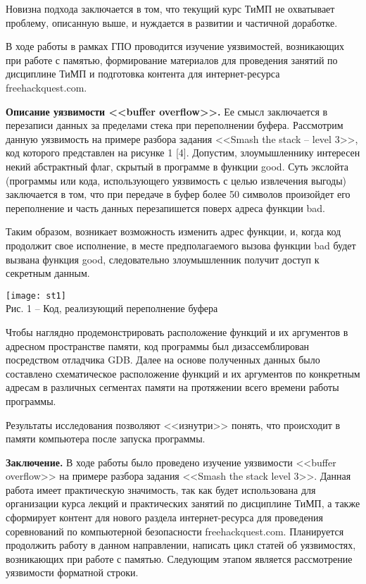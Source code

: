 Новизна подхода заключается в том, что текущий курс ТиМП не охватывает проблему, описанную выше, и нуждается в развитии и частичной доработке.\par
В ходе работы в рамках ГПО проводится изучение уязвимостей, возникающих при работе с памятью, формирование материалов для проведения занятий по дисциплине ТиМП и подготовка контента для интернет-ресурса freehackquest.com.\par
\textbf{Описание уязвимости <<buffer overflow>>.} Ее смысл заключается в перезаписи данных за пределами стека при переполнении буфера. Рассмотрим данную уязвимость на примере разбора задания <<Smash the stack -- level 3>>, код которого представлен на рисунке 1 [4]. Допустим, злоумышленнику интересен некий абстрактный флаг, скрытый в программе в функции good. Суть экслойта (программы или кода, использующего уязвимость с целью извлечения выгоды) заключается в том, что при передаче в буфер более 50 символов произойдет его переполнение и часть данных перезапишется поверх адреса функции bad.\par 
Таким образом, возникает возможность изменить адрес функции, и, когда код продолжит свое исполнение, в месте предполагаемого вызова функции bad будет вызвана функция good, следовательно злоумышленник получит доступ к секретным данным.\par
\begin{center}
\texttt{[image: st1]}\\
\small{Рис. 1 -- Код, реализующий переполнение буфера}\\
\end{center}
\vspace{\baselineskip}
Чтобы наглядно продемонстрировать расположение функций и их аргументов в адресном пространстве памяти, код программы был дизассемблирован посредством отладчика GDB. Далее на основе полученных данных было составлено схематическое расположение функций и их аргументов по конкретным адресам в различных сегментах памяти на протяжении всего времени работы программы.\par 
Результаты исследования позволяют <<изнутри>> понять, что происходит в памяти компьютера после запуска программы.\par
\textbf{Заключение.} В ходе работы было проведено изучение уязвимости <<buffer overflow>> на примере разбора задания <<Smash the stack level 3>>. Данная работа имеет практическую значимость, так как будет использована для организации курса лекций и практических занятий по дисциплине ТиМП, а также сформирует контент для нового раздела интернет-ресурса для проведения соревнований по компьютерной безопасности freehackquest.com. Планируется продолжить работу в данном направлении, написать цикл статей об уязвимостях, возникающих при работе с памятью. Следующим этапом является рассмотрение уязвимости форматной строки.\par

